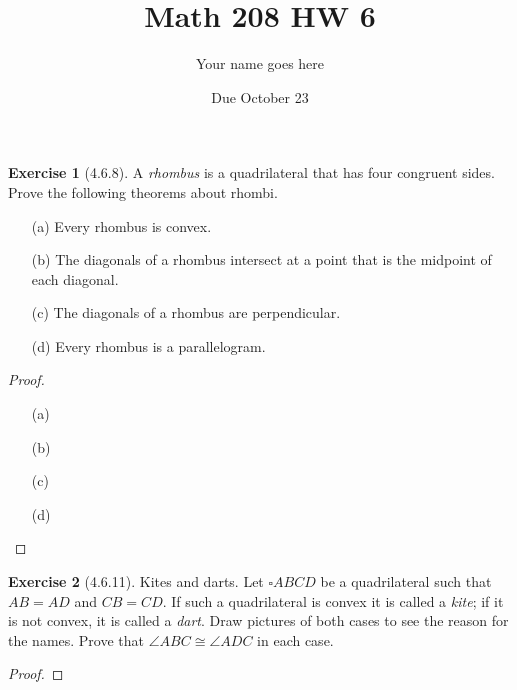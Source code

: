 \documentclass[12pt]{article}		%
\title{Math 208 HW 6}
\author{Your name goes here}
\date{Due October 23}
\theoremstyle{definition}
\newtheorem*{ex}{Exercise}
\begin{document}
	\maketitle
	
	


\begin{ex}[4.6.8]
	A \textit{rhombus} is a quadrilateral that has four congruent sides.  Prove the following theorems about rhombi.
	\begin{itemize}
		\item[(a)]  Every rhombus is convex.
		\item[(b)]  The diagonals of a rhombus intersect at a point that is the midpoint of each diagonal.
		\item[(c)]  The diagonals of a rhombus are perpendicular.
		\item[(d)]  Every rhombus is a parallelogram.
	\end{itemize}
\end{ex}

\begin{proof} 
	$\,$
	
	\begin{itemize}
		\item[(a)]     
		
		\item[(b)]
		
		\item[(c)]
		
		\item[(d)]
	\end{itemize}
	
\end{proof}



\vspace{1in} %



	
\begin{ex}[4.6.11]
	Kites and darts.  Let $\square ABCD$ be a quadrilateral such that $AB = AD$ and $CB = CD$.  If such a quadrilateral is convex it is called a \textit{kite}; if it is not convex, it is called a  \textit{dart}.  Draw pictures of both cases to see the reason for the names.  Prove that $\angle ABC \cong \angle ADC$ in each case.
\end{ex}

\begin{proof} 
	  
	
\end{proof}



\vspace{1in} %




	
	
	
\end{document}
